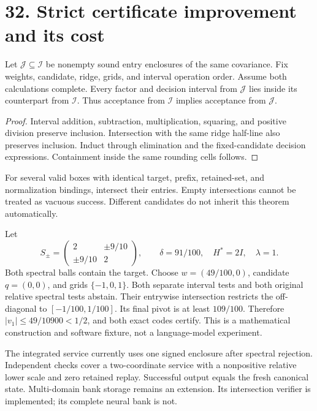 \newpage
\section*{32. Strict certificate improvement and its cost}
\begin{theorem}
Let $\mathcal J\subseteq\mathcal I$ be nonempty sound entry enclosures of the same covariance.
Fix weights, candidate, ridge, grids, and interval operation order.
Assume both calculations complete.
Every factor and decision interval from $\mathcal J$ lies inside its counterpart from $\mathcal I$.
Thus acceptance from $\mathcal I$ implies acceptance from $\mathcal J$.
\end{theorem}
\begin{proof}
Interval addition, subtraction, multiplication, squaring, and positive division preserve inclusion.
Intersection with the same ridge half-line also preserves inclusion.
Induct through elimination and the fixed-candidate decision expressions.
Containment inside the same rounding cells follows.
\end{proof}

For several valid boxes with identical target, prefix, retained-set, and normalization bindings, intersect their entries.
Empty intersections cannot be treated as vacuous success.
Different candidates do not inherit this theorem automatically.

Let
\[
 S_\pm=\begin{pmatrix}2&\pm9/10\\\pm9/10&2\end{pmatrix},\qquad
 \delta=91/100,\quad H^*=2I,\quad\lambda=1.
\]
Both spectral balls contain the target.
Choose $w=(49/100,0)$, candidate $q=(0,0)$, and grids $\{-1,0,1\}$.
Both separate interval tests and both original relative spectral tests abstain.
Their entrywise intersection restricts the off-diagonal to $[-1/100,1/100]$.
Its final pivot is at least $109/100$.
Therefore $|v_1|\le49/10900<1/2$, and both exact codes certify.
This is a mathematical construction and software fixture, not a language-model experiment.

The integrated service currently uses one signed enclosure after spectral rejection.
Independent checks cover a two-coordinate service with a nonpositive relative lower scale and zero retained replay.
Successful output equals the fresh canonical state.
Multi-domain bank storage remains an extension.
Its intersection verifier is implemented; its complete neural bank is not.

